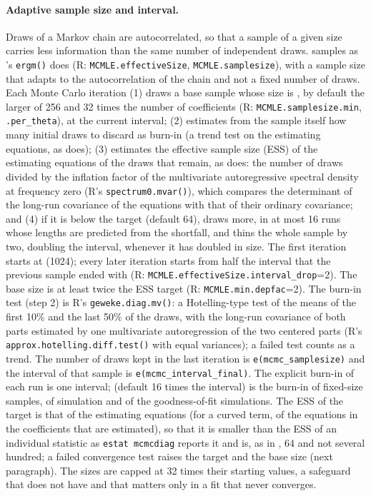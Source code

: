\paragraph{Adaptive sample size and interval.}\label{sec:adaptive} Draws of a Markov chain are autocorrelated, so that a sample of a given size carries less information than the same number of independent draws. \nwergm{} samples as \ergm{}'s \texttt{ergm()} does (R: \texttt{MCMLE.effectiveSize}, \texttt{MCMLE.samplesize}), with a sample size that adapts to the autocorrelation of the chain and not a fixed number of draws. Each Monte Carlo iteration (1) draws a base sample whose size is , by default the larger of 256 and 32 times the number of coefficients (R: \texttt{MCMLE.samplesize.min}, \texttt{.per\_theta}), at the current interval; (2) estimates from the sample itself how many initial draws to discard as burn-in (a trend test on the estimating equations, as \ergm{} does); (3) estimates the effective sample size (ESS) of the estimating equations of the draws that remain, as \ergm{} does: the number of draws divided by the inflation factor of the multivariate autoregressive spectral density at frequency zero (R's \texttt{spectrum0.mvar()}), which compares the determinant of the long-run covariance of the equations with that of their ordinary covariance; and (4) if it is below the target  (default 64), draws more, in at most 16 runs whose lengths are predicted from the shortfall, and thins the whole sample by two, doubling the interval, whenever it has doubled in size. The first iteration starts at  (1024); every later iteration starts from half the interval that the previous sample ended with (R: \texttt{MCMLE.effectiveSize.interval\_drop}=2). The base size is at least twice the ESS target (R: \texttt{MCMLE.min.depfac}=2). The burn-in test (step 2) is R's \texttt{geweke.diag.mv()}: a Hotelling-type test of the means of the first 10\% and the last 50\% of the draws, with the long-run covariance of both parts estimated by one multivariate autoregression of the two centered parts (R's \texttt{approx.hotelling.diff.test()} with equal variances); a failed test counts as a trend. The number of draws kept in the last iteration is \texttt{e(mcmc\_samplesize)} and the interval of that sample is \texttt{e(mcmc\_interval\_final)}. The explicit burn-in of each run is one interval;  (default 16 times the interval) is the burn-in of fixed-size samples, of simulation and of the goodness-of-fit simulations. The ESS of the target is that of the estimating equations (for a curved term, of the equations in the coefficients that are estimated), so that it is smaller than the ESS of an individual statistic as \texttt{estat mcmcdiag} reports it and is, as in \ergm{}, 64 and not several hundred; a failed convergence test raises the target and the base size (next paragraph). The sizes are capped at 32 times their starting values, a safeguard that \ergm{} does not have and that matters only in a fit that never converges.

